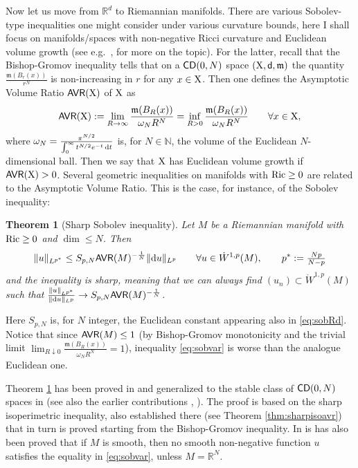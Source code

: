 \documentclass[11pt]{article}
\numberwithin{equation}{section}
\newtheorem{theorem}{Theorem}[section]
\newcommand{\N}{\mathbb{N}}
\newcommand{\R}{\mathbb{R}}
\newcommand{\X}{{\rm X}}
\newcommand{\sfd}{{\sf d}}
\newcommand{\mm}{{\mathfrak m}}
\newcommand{\CD}{{\sf CD}}
\renewcommand{\d}{{\rm d}}
\newcommand{\AVR}{{\sf AVR}}
\begin{document}
Now let us move from $\R^d$ to Riemannian manifolds. There are various Sobolev-type inequalities one might consider under various curvature bounds, here I shall focus on manifolds/spaces with non-negative Ricci curvature and Euclidean volume growth (see e.g.\ \cite{He99}, \cite{DrHe02} for more on the topic). For the latter, recall that the Bishop-Gromov inequality tells that on a $\CD(0,N)$ space $(\X,\sfd,\mm)$ the quantity $\frac{\mm(B_r( x))}{r^N}$ is non-increasing in $r$ for any $x\in\X$. Then one defines the Asymptotic Volume Ratio $\AVR(\X)$ of $\X$ as
\begin{equation}
\label{eq:defavr}
\AVR(\X):=\lim_{R\to\infty}\frac{\mm(B_R(x))}{\omega_NR^N}=\inf_{R>0}\frac{\mm(B_R(x))}{\omega_NR^N}\qquad\forall x\in \X,
\end{equation}
where $\omega_N=\frac{\pi^{ N/2}}{\int_0^\infty t^{ N/2}e^{-t}\,\d t}$ is, for $N\in\N$, the volume of the Euclidean $N$-dimensional ball. Then we say that $\X$ has Euclidean volume growth if $\AVR(\X)>0$. Several geometric inequalities on manifolds with ${\rm Ric}\geq0$ are related to the Asymptotic Volume Ratio. This is the case, for instance, of  the Sobolev inequality:
\begin{theorem}[Sharp Sobolev  inequality]\label{thm:sharpsobman} Let $M$ be a Riemannian manifold with ${\rm Ric}\geq 0$ and $\dim\leq N$. Then
\begin{equation}
\label{eq:sobvar}
\|u\|_{L^{p^*}}\leq S_{p,N}\AVR(M)^{-\frac1N} \|\d u\|_{L^p}  \qquad\forall u\in \dot W^{1,p}(M),\qquad p^*:=\tfrac{Np}{N-p}
\end{equation}
and the inequality is sharp, meaning that we can always find $(u_n)\subset \dot W^{1,p}(M)$ such that $\frac{\|u\|_{L^{p^*}}}{\|\d u\|_{L^p}}\to S_{p,N}\AVR(M)^{-\frac1N}$.
\end{theorem}
Here $S_{p,N}$ is, for $N$ integer, the Euclidean constant appearing also in \eqref{eq:sobRd}. Notice that since $\AVR(M)\leq 1$ (by Bishop-Gromov monotonicity and the trivial limit $\lim_{R\downarrow0}\frac{\mm(B_R(x))}{\omega_NR^N}=1$), inequality \eqref{eq:sobvar} is worse than the analogue Euclidean one.

Theorem \ref{thm:sharpsobman}  has been proved in \cite{BalKri23} and generalized to the stable class of $\CD(0,N)$ spaces in \cite{NoVi22} (see also the earlier contributions \cite{Ledoux99}, \cite{Xia01}). The proof is based on the sharp isoperimetric inequality, also established there (see Theorem \ref{thm:sharpisoavr}) that in turn is proved starting from the Bishop-Gromov inequality. In \cite{BalKri23} is has also been proved that if $M$ is smooth, then no smooth non-negative function $u$ satisfies the equality in \eqref{eq:sobvar}, unless $M=\R^N$. 
\end{document}
